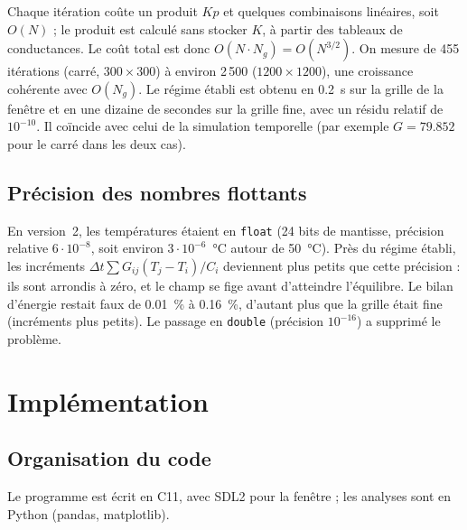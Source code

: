 \documentclass[11pt,a4paper]{article}
\theoremstyle{definition}
\theoremstyle{remark}
\newcommand{\dt}{\Delta t}
\begin{document}
Chaque itération coûte un produit $Kp$ et quelques combinaisons linéaires, soit
$O(N)$ ; le produit est calculé sans stocker $K$, à partir des tableaux de
conductances. Le coût total est donc $O(N\cdot N_g) = O(N^{3/2})$. On mesure de 455
itérations (carré, $300\times300$) à environ 2\,500 ($1200\times1200$), une croissance
cohérente avec $O(N_g)$. Le régime établi est obtenu en \qty{0,2}{\second} sur la grille
de la fenêtre et en une dizaine de secondes sur la grille fine, avec un résidu
relatif de $10^{-10}$. Il coïncide avec celui de la simulation temporelle (par
exemple $G = \num{79,852}$ pour le carré dans les deux cas).

\subsection{Précision des nombres flottants}

En version~2, les températures étaient en \texttt{float} (24 bits de mantisse,
précision relative $6\cdot10^{-8}$, soit environ $3\cdot10^{-6}$~°C autour de
\qty{50}{\degreeCelsius}). Près du régime établi, les incréments
$\dt\sum G_{ij}(T_j-T_i)/C_i$ deviennent plus petits que cette précision : ils sont
arrondis à zéro, et le champ se fige avant d'atteindre l'équilibre. Le bilan d'énergie
restait faux de \qty{0,01}{\percent} à \qty{0,16}{\percent}, d'autant plus que la grille
était fine (incréments plus petits). Le passage en \texttt{double} (précision
$10^{-16}$) a supprimé le problème.

\section{Implémentation}\label{sec-implementation}

\subsection{Organisation du code}

Le programme est écrit en C11, avec SDL2 pour la fenêtre ; les analyses sont en
Python (pandas, matplotlib).
\end{document}
